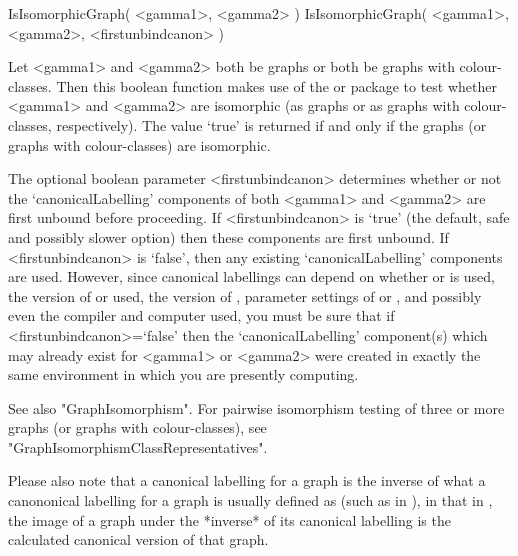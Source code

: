 
\>IsIsomorphicGraph( <gamma1>, <gamma2> )
\>IsIsomorphicGraph( <gamma1>, <gamma2>, <firstunbindcanon> )

Let <gamma1> and <gamma2> both be graphs or both be graphs with
colour-classes.  Then this boolean function makes use of the {\nauty} or 
{\bliss} package to test whether <gamma1> and <gamma2> are isomorphic 
(as graphs or as graphs with colour-classes, respectively). The
value `true' is returned if and only if the graphs (or graphs with
colour-classes) are isomorphic.

The optional boolean parameter <firstunbindcanon> determines whether or
not the `canonicalLabelling' components of both <gamma1> and <gamma2>
are first unbound before proceeding.  If <firstunbindcanon> is `true'
(the default, safe and possibly slower option) then these components
are first unbound.  If <firstunbindcanon> is `false', then any existing
`canonicalLabelling' components are used.  However, since canonical
labellings can depend on whether {\nauty} or {\bliss} is used, the version
of {\nauty} or {\bliss} used, the version of {\GRAPE}, parameter settings
of {\nauty} or {\bliss}, and possibly even the compiler and computer
used, you must be sure that if <firstunbindcanon>=`false' then the
`canonicalLabelling' component(s) which may already exist for <gamma1>
or <gamma2> were created in exactly the same environment in which you
are presently computing.

See also "GraphIsomorphism".  For pairwise isomorphism testing
of three or more graphs (or graphs with colour-classes), see
"GraphIsomorphismClassRepresentatives".

Please also note that a canonical labelling for a {\GRAPE} graph is the
inverse of what a canononical labelling for a graph is usually defined as
(such as in {\bliss}), in that in {\GRAPE}, the image of a graph under
the *inverse* of its canonical labelling is the calculated canonical
version of that graph.

